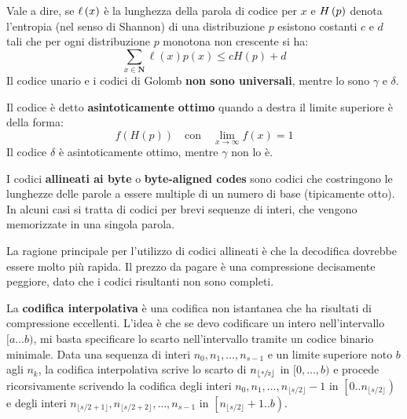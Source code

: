 \documentclass[\main/main.tex]{subfiles}
\begin{document}
\begin{multicols}{2}
\begin{property}
    Vale a dire, se \(\ell\left(x\right)\) è la lunghezza della parola di codice per \(x\) e \(H\left(p\right)\) denota l'entropia (nel senso di Shannon) di una distribuzione \(p\) esistono costanti \(c\) e \(d\) tali che per ogni distribuzione \(p\) monotona non crescente si ha:
    \[
        \sum_{x \in \mathbf{N}} \ell(x) p(x) \leq c H(p)+d
    \]
    Il codice unario e i codici di Golomb \textbf{non sono universali}, mentre lo sono \(\gamma\) e \(\delta\).
\end{property}
\begin{property}
    Il codice è detto \textbf{asintoticamente ottimo} quando a destra il limite superiore è della forma:
    \[
        f(H(p)) \quad \text{con} \quad \lim _{x \rightarrow \infty} f(x)=1
    \]
    Il codice \(\delta\) è asintoticamente ottimo, mentre \(\gamma\) non lo è.
\end{property}
\begin{definition}
    I codici \textbf{allineati ai byte} o \textbf{byte-aligned codes} sono codici che costringono le lunghezze delle parole a essere multiple di un numero di base (tipicamente otto). In alcuni casi si tratta di codici per brevi sequenze di interi, che vengono memorizzate in una singola parola.
\end{definition}
\begin{observation}
    La ragione principale per l'utilizzo di codici allineati è che la decodifica dovrebbe essere molto più rapida. Il prezzo da pagare è una compressione decisamente peggiore, dato che i codici risultanti non sono completi.
\end{observation}
\begin{definition}
    La \textbf{codifica interpolativa} è una codifica non istantanea che ha risultati di compressione eccellenti. L'idea è che se devo codificare un intero nell'intervallo \([a\ldots b)\), mi basta specificare lo scarto nell'intervallo tramite un codice binario minimale. Data una sequenza di interi \(n_0, n_1, \ldots, n_{s-1}\) e un limite superiore noto \(b\) agli \(n_k\), la codifica interpolativa scrive lo scarto di \(n_{\left\lfloor\sfrac{s}{2}\right\rfloor}\) in \([0, \ldots, b)\) e procede ricorsivamente scrivendo la codifica degli interi \(n_{0}, n_{1}, \ldots, n_{\lfloor s / 2\rfloor}-1\) in \(\left[0 . . n_{\lfloor s / 2\rfloor}\right)\) e degli interi \(n_{\lfloor s / 2+1\rfloor}, n_{\lfloor s / 2+2\rfloor}, \dots, n_{s-1}\) in \(\left[n_{\lfloor s / 2\rfloor}+1 . . b\right)\).

\end{definition}
\end{multicols}
\end{document}
